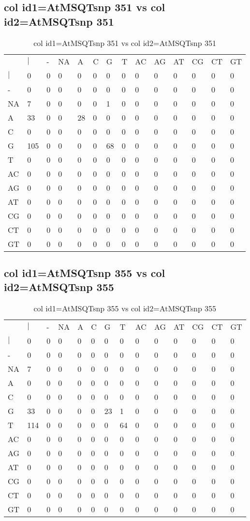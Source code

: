 \subsection{col id1=AtMSQTsnp 351 vs col id2=AtMSQTsnp 351}
\begin{center}
\begin{longtable}{|l|l|l|l|l|l|l|l|l|l|l|l|l|l|}
\caption{col id1=AtMSQTsnp 351 vs col id2=AtMSQTsnp 351} \label{table_dm672}\\
\hline
\\
\hline
&$|$&-&NA&A&C&G&T&AC&AG&AT&CG&CT&GT\\
$|$&0&0&0&0&0&0&0&0&0&0&0&0&0\\
-&0&0&0&0&0&0&0&0&0&0&0&0&0\\
NA&7&0&0&0&0&1&0&0&0&0&0&0&0\\
A&33&0&0&28&0&0&0&0&0&0&0&0&0\\
C&0&0&0&0&0&0&0&0&0&0&0&0&0\\
G&105&0&0&0&0&68&0&0&0&0&0&0&0\\
T&0&0&0&0&0&0&0&0&0&0&0&0&0\\
AC&0&0&0&0&0&0&0&0&0&0&0&0&0\\
AG&0&0&0&0&0&0&0&0&0&0&0&0&0\\
AT&0&0&0&0&0&0&0&0&0&0&0&0&0\\
CG&0&0&0&0&0&0&0&0&0&0&0&0&0\\
CT&0&0&0&0&0&0&0&0&0&0&0&0&0\\
GT&0&0&0&0&0&0&0&0&0&0&0&0&0\\
\hline
\end{longtable}
\end{center}

\subsection{col id1=AtMSQTsnp 355 vs col id2=AtMSQTsnp 355}
\begin{center}
\begin{longtable}{|l|l|l|l|l|l|l|l|l|l|l|l|l|l|}
\caption{col id1=AtMSQTsnp 355 vs col id2=AtMSQTsnp 355} \label{table_dm674}\\
\hline
\\
\hline
&$|$&-&NA&A&C&G&T&AC&AG&AT&CG&CT&GT\\
$|$&0&0&0&0&0&0&0&0&0&0&0&0&0\\
-&0&0&0&0&0&0&0&0&0&0&0&0&0\\
NA&7&0&0&0&0&0&0&0&0&0&0&0&0\\
A&0&0&0&0&0&0&0&0&0&0&0&0&0\\
C&0&0&0&0&0&0&0&0&0&0&0&0&0\\
G&33&0&0&0&0&23&1&0&0&0&0&0&0\\
T&114&0&0&0&0&0&64&0&0&0&0&0&0\\
AC&0&0&0&0&0&0&0&0&0&0&0&0&0\\
AG&0&0&0&0&0&0&0&0&0&0&0&0&0\\
AT&0&0&0&0&0&0&0&0&0&0&0&0&0\\
CG&0&0&0&0&0&0&0&0&0&0&0&0&0\\
CT&0&0&0&0&0&0&0&0&0&0&0&0&0\\
GT&0&0&0&0&0&0&0&0&0&0&0&0&0\\
\hline
\end{longtable}
\end{center}

